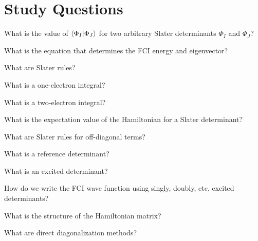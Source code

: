 \documentclass[../Main/chem532-notes.tex]{subfiles}
\begin{document}
\section*{Study Questions}
\begin{myenumerate}
\item What is the value of $\braket{\Phi_I | \Phi_J}$ for two arbitrary Slater determinants $\Phi_I$ and $\Phi_J$?
\item What is the equation that determines the FCI energy and eigenvector?
\item What are Slater rules?
\item What is a one-electron integral?
\item What is a two-electron integral?
\item What is the expectation value of the Hamiltonian for a Slater determinant?
\item What are Slater rules for off-diagonal terms?
\item What is a reference determinant?
\item What is an excited determinant?
\item How do we write the FCI wave function using singly, doubly, etc. excited determinants?
\item What is the structure of the Hamiltonian matrix?
\item What are direct diagonalization methods?
\end{myenumerate}
\end{document}
